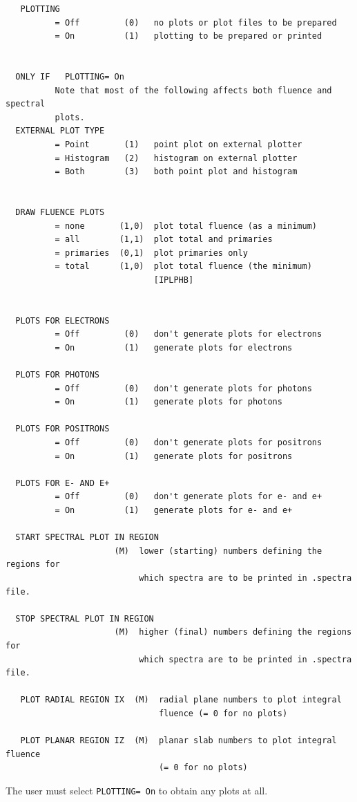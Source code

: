 \documentclass[12pt,twoside]{article}  %
\begin{document}
\begin{verbatim}
   PLOTTING
          = Off         (0)   no plots or plot files to be prepared
          = On          (1)   plotting to be prepared or printed


  ONLY IF   PLOTTING= On
          Note that most of the following affects both fluence and spectral
          plots.
  EXTERNAL PLOT TYPE
          = Point       (1)   point plot on external plotter
          = Histogram   (2)   histogram on external plotter
          = Both        (3)   both point plot and histogram 


  DRAW FLUENCE PLOTS
          = none       (1,0)  plot total fluence (as a minimum)
          = all        (1,1)  plot total and primaries
          = primaries  (0,1)  plot primaries only
          = total      (1,0)  plot total fluence (the minimum)
                              [IPLPHB]


  PLOTS FOR ELECTRONS
          = Off         (0)   don't generate plots for electrons
          = On          (1)   generate plots for electrons

  PLOTS FOR PHOTONS
          = Off         (0)   don't generate plots for photons
          = On          (1)   generate plots for photons

  PLOTS FOR POSITRONS
          = Off         (0)   don't generate plots for positrons
          = On          (1)   generate plots for positrons

  PLOTS FOR E- AND E+
          = Off         (0)   don't generate plots for e- and e+
          = On          (1)   generate plots for e- and e+

  START SPECTRAL PLOT IN REGION
                      (M)  lower (starting) numbers defining the regions for
                           which spectra are to be printed in .spectra file.

  STOP SPECTRAL PLOT IN REGION
                      (M)  higher (final) numbers defining the regions for
                           which spectra are to be printed in .spectra file.  

   PLOT RADIAL REGION IX  (M)  radial plane numbers to plot integral 
                               fluence (= 0 for no plots)

   PLOT PLANAR REGION IZ  (M)  planar slab numbers to plot integral fluence
                               (= 0 for no plots)                             
\end{verbatim}

The user must select {\tt PLOTTING= On} to obtain any plots at all. 
\end{document}
